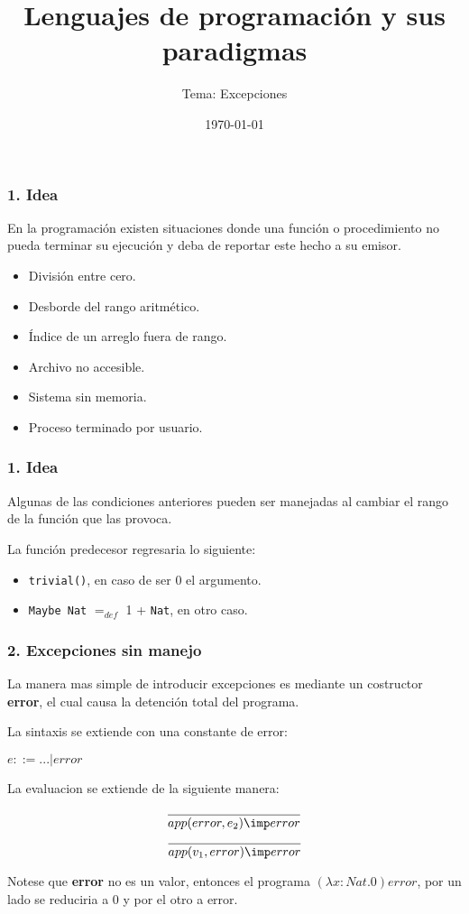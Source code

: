 \documentclass[xcolor=dvipsnames,table,spanish]{beamer}
\title[]{Lenguajes de programación y sus paradigmas}
\subtitle{Tema: Excepciones}
\author[]{}
\institute[UNAM-FC]{Facultad de Ciencias\\
Universidad Nacional Aut\'onoma de M\'exico}
\date[]{\small{\today}
\newline{\tiny{Material desarrollado bajo el proyecto UNAM-PAPIME PE102117.}}}
\begin{document}
\frame{\titlepage}

\begin{frame}
  \frametitle{1. Idea}
	En la programación existen situaciones donde una función o 		procedimiento no pueda terminar su ejecución y deba de 			reportar este hecho a su emisor.

	\begin{examples}
	\begin{itemize}
		\item División entre cero.
		\item Desborde del rango aritmético.
		\item Índice de un arreglo fuera de rango.
        \item Archivo no accesible.
        \item Sistema sin memoria.
        \item Proceso terminado por usuario.
	\end{itemize}
    \end{examples}
\end{frame}

\begin{frame}
  \frametitle{1. Idea}
	Algunas de las condiciones anteriores pueden ser manejadas al cambiar el rango de la función que las provoca.

  	\begin{example}
    La función predecesor regresaria lo siguiente:\newline
    \begin{itemize}
        \item \texttt{trivial()}, en caso de ser 0 el argumento.\newline
  	    \item \texttt{Maybe Nat} $=_{def}$ 1 + \texttt{Nat}, en otro caso.
    \end{itemize}
  	\end{example}

\end{frame}

\begin{frame}
  \frametitle{2. Excepciones sin manejo}
  La manera mas simple de introducir excepciones es mediante un costructor \textbf{error}, el cual causa la detención total del programa.\newline

  La sintaxis se extiende con una constante de error:
  \begin{center}
      $e::=...|error$
  \end{center}
  La evaluacion se extiende de la siguiente manera:
  \begin{center}
      \begin{equation*}
         \frac{}{app(error,e_2)\imp error}
	  \end{equation*}
      \begin{equation*}
         \frac{}{app(v_1,error)\imp error}
	  \end{equation*}
  \end{center}
Notese que \textbf{error} no es un valor, entonces el programa $(\lambda x: Nat.0)error$, por un lado se reduciria a 0 y por el otro a error.
\end{frame}
\end{document}
